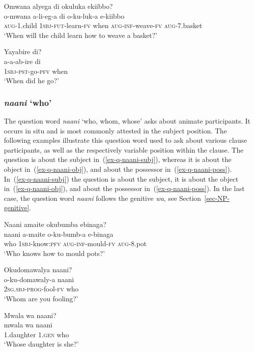 \ea \label{ex-q-di}
\begin{xlist}
\ex	\label{ex-q-di-1}
	\glll Omwana alyega di okuluka ekiibbo?\\
		 o-mwana 		a-li-eg-a di o-ku-luk-a e-kiibbo\\
		\textsc{aug}-1.child \textsc{1sbj}-\textsc{fut}-learn-\textsc{fv} when \textsc{aug}-\textsc{inf}-weave-\textsc{fv} \textsc{aug}-7.basket\\
	\glt `When will the child learn how to weave a basket?'

\ex	\label{ex-q-di-2}
	\glll Yayabire di?\\
		a-a-ab-ire di\\
		\textsc{1sbj}-\textsc{pst}-go-\textsc{pfv} when\\
	\glt	`When did he go?'
\end{xlist}
\z

\subsubsection{\emph{naani} `who'}  
The question word \emph{naani} `who, whom, whose' asks about animate participants. 
It occurs in situ and is most commonly attested in the subject position. 
The following examples illustrate this question word used to ask about various clause participants, as well as the respectively variable position within the clause. 
The question is about the subject in~(\ref{ex-q-naani-subj}), whereas it is about the object in~(\ref{ex-q-naani-obj}), and about the possessor in~(\ref{ex-q-naani-poss}). 
In~(\ref{ex-q-naani-subj}) the question is about the subject, it is about the object in~(\ref{ex-q-naani-obj}), and about the possessor in~(\ref{ex-q-naani-poss}). 
In the last case, the question word  \emph{naani} follows the genitive \emph{wa}, see Section~\ref{sec-NP-genitive}.

\ea \label{ex-q-naani}
\begin{xlist}
\ex 	\label{ex-q-naani-subj}
	\glll Naani amaite okubumba ebinaga?\\
		 naani a-maite o-ku-bumb-a e-binaga\\
	who \textsc{1sbj}-know:\textsc{pfv} \textsc{aug}-\textsc{inf}-mould-\textsc{fv} \textsc{aug}-8.pot\\
	\glt `Who knows how to mould pots?'

\ex 	\label{ex-q-naani-obj}
	\glll Okudomawalya naani?\\
		o-ku-domawaly-a naani\\
	2\textsc{sg.sbj}-\textsc{prog}-fool-\textsc{fv} who\\
	\glt ‘Whom are you fooling?'

\ex	\label{ex-q-naani-poss}
	\glll Mwala wa naani?\\
	  mwala wa naani\\
	1.daughter  1.\textsc{gen} who\\
\glt ‘Whose daughter is she?'
\end{xlist}
\z

